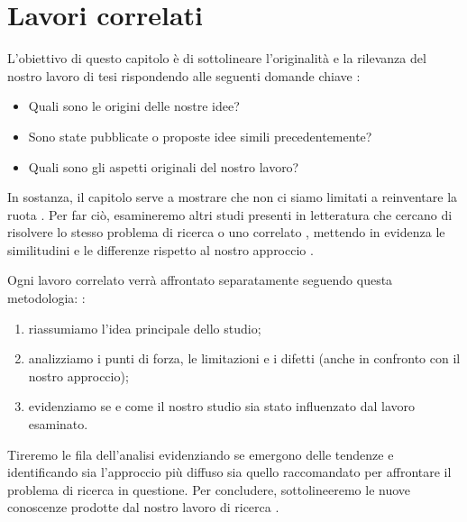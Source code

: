 \chapter{Lavori correlati}
\label{chap:correlati}

\acresetall

L'obiettivo di questo capitolo è di sottolineare l'originalità e la rilevanza del nostro lavoro di tesi rispondendo alle seguenti domande chiave \cite{aceto2023paper}:
\begin{itemize}
\item Quali sono le origini delle nostre idee?
\item Sono state pubblicate o proposte idee simili precedentemente?
\item Quali sono gli aspetti originali del nostro lavoro?
\end{itemize}

In sostanza, il capitolo serve a mostrare che non ci siamo limitati a reinventare la ruota \cite{tuni2019guide}. Per far ciò, esamineremo altri studi presenti in letteratura che cercano di risolvere lo stesso problema di ricerca o uno correlato \cite{pfandzelter2022thesis}, mettendo in evidenza le similitudini e le differenze rispetto al nostro approccio \cite{tuni2019guide}.

\medskip

Ogni lavoro correlato verrà affrontato separatamente seguendo questa metodologia: \cite{pfandzelter2022thesis}:
\begin{enumerate}
\item riassumiamo l'idea principale dello studio;
\item analizziamo i punti di forza, le limitazioni e i difetti (anche in confronto con il nostro approccio);
\item evidenziamo se e come il nostro studio sia stato influenzato dal lavoro esaminato.
\end{enumerate}

Tireremo le fila dell'analisi evidenziando se emergono delle tendenze e identificando sia l'approccio più diffuso sia quello raccomandato per affrontare il problema di ricerca in questione. Per concludere, sottolineeremo le nuove conoscenze prodotte dal nostro lavoro di ricerca \cite{tuni2019guide}.

